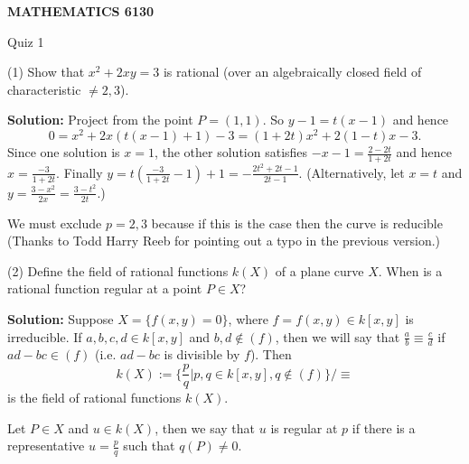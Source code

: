 \documentclass[12pt]{amsart}
\begin{document}
\bigskip\bigskip\bigskip\bigskip
\centerline{\bf MATHEMATICS 6130}
\centerline{Quiz 1}

(1) Show that $x^2+2xy=3$ is rational (over an 
algebraically closed field of characteristic $\ne 2,3$).

{\bf Solution:} Project from the point $P=(1,1)$. So $y-1=t(x-1)$ and hence $$0=x^2+2x(t(x-1)+1)-3=(1+2t)x^2+2(1-t)x-3.$$
Since one solution is $x=1$, the other solution satisfies $-x-1=\frac{2-2t}{1+2t}$ and hence $x=\frac {-3}{1+2t}$. Finally $y=t(\frac {-3}{1+2t}-1)+1=-\frac{2t^2+2t-1}{2t-1}$. (Alternatively, let $x=t$ and $y=\frac {3-x^2}{2x}=\frac {3 -t^2}{2t}$.)

We must exclude $p=2,3$ because if this is the case then the curve is reducible (Thanks to Todd Harry Reeb for pointing out a typo in the previous version.)

(2) Define the field of rational functions $k(X)$ of a plane curve $X$. When is a rational function regular at a point $P\in X$?

{\bf Solution:} Suppose $X=\{f(x,y)=0\}$, where $f=f(x,y)\in k[x,y]$ is irreducible. If $a,b,c,d\in k[x,y]$ and $b,d\not\in (f)$, then we will say that $\frac ab \equiv \frac cd$ if $ad-bc\in (f)$ (i.e. $ad-bc$ is divisible by $f$). Then
$$k(X):=\{\frac pq| p,q\in k[x,y],q\not\in (f)\} / \equiv $$
is the field of rational functions $k(X)$.

Let $P\in X$ and $u\in k(X)$, then we say that $u$ is regular at $p$ if there is a representative $u=\frac pq$ such that $q(P)\ne 0$.
\end{document}
